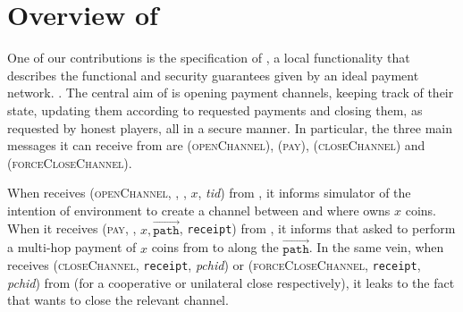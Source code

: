 \section{Overview of \fpaynet{}}
\label{sec:ov-paynet}
  One of our contributions is the specification of \fpaynet, a local functionality
  that describes the functional and security guarantees given by an ideal
  payment network. . The central aim of \fpaynet{} is opening payment
  channels, keeping track of their state, updating them according to requested
  payments and closing them, as requested by honest players, all in a secure
  manner. In particular, the three main messages it can receive from \alice{}
  are (\textsc{openChannel}), (\textsc{pay}), (\textsc{closeChannel}) and
  (\textsc{forceCloseChannel}).

  When \fpaynet{} receives (\textsc{openChannel}, \alice, \bob, $x$,
  \textit{tid}) from \alice, it informs simulator \simulator{} of the
  intention of environment \environment{} to create a channel between
  \alice{} and \bob{} where \alice{} owns $x$ coins. When it receives
  (\textsc{pay}, \bob, $x, \overrightarrow{\mathtt{path}}$, \texttt{receipt})
  from \alice, it informs \simulator{} that \environment{} asked to perform a
  multi-hop payment of $x$ coins from \alice{} to \bob{} along the
  $\overrightarrow{\mathtt{path}}$. In the same vein, when \fpaynet{}
  receives (\textsc{closeChannel}, \texttt{receipt}, \textit{pchid}) or
  (\textsc{forceCloseChannel}, \texttt{receipt}, \textit{pchid}) from
  \alice{} (for a cooperative or unilateral close respectively), it
  leaks to \simulator{} the fact that \environment{} wants to close the relevant
  channel.

